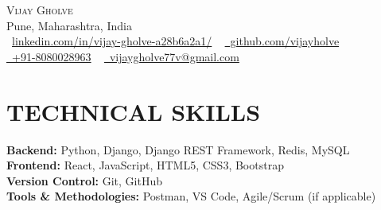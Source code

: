 \documentclass[letterpaper,11pt]{article}
\begin{document}


\begin{center}
{\Huge \scshape Vijay Gholve} \\ \vspace{1pt}
Pune, Maharashtra, India \\ \vspace{1pt}
{\raisebox{-0.2\height}\faLinkedinSquare\ \href{https://www.linkedin.com/in/vijay-gholve-a28b6a2a1/}{linkedin.com/in/vijay-gholve-a28b6a2a1/}} ~
\href{https://github.com/vijayholve}{\raisebox{-0.2\height}\faGithub\ github.com/vijayholve} \\ \vspace{1pt} %
\small \href{tel:+918080028963}{ \raisebox{-0.1\height}\faPhone\ +91-8080028963} ~ \href{mailto:vijaygholve77v@gmail.com}{\raisebox{-0.2\height}\faEnvelope\ vijaygholve77v@gmail.com} ~

\end{center}


\section{TECHNICAL SKILLS}
 \begin{itemize}[leftmargin=0.15in, label={}]
\small{\item{
\textbf{Backend:} Python, Django, Django REST Framework, Redis, MySQL \\
\textbf{Frontend:} React, JavaScript, HTML5, CSS3, Bootstrap \\
\textbf{Version Control:} Git, GitHub \\
\textbf{Tools & Methodologies:} Postman, VS Code, Agile/Scrum (if applicable)
}}
 \end{itemize}
 \vspace{-15pt}
\end{document}
